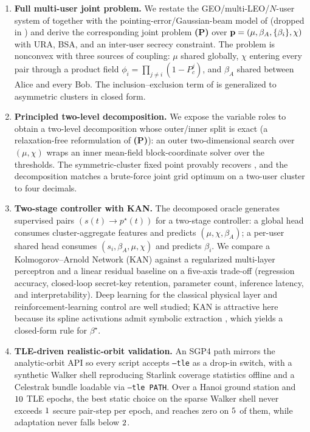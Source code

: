 \begin{enumerate}
\item \textbf{Full multi-user joint problem.} We restate the GEO/multi-LEO/$N$-user system of \cite{vu2023photonics} together with the pointing-error/Gaussian-beam model of \cite{vu2020access} (dropped in \cite{vu2023photonics}) and derive the corresponding joint problem \textbf{(P)} over $\mathbf{p}=(\mu, \beta_A, \{\beta_i\}, \chi)$ with URA, BSA, and an inter-user secrecy constraint. The problem is nonconvex with three sources of coupling: $\mu$ shared globally, $\chi$ entering every pair through a product field $\phi_i = \prod_{j\neq i}(1-P_c^j)$, and $\beta_A$ shared between Alice and every Bob. The inclusion--exclusion term of \cite[Eq.~22]{vu2023photonics} is generalized to asymmetric clusters in closed form.
\item \textbf{Principled two-level decomposition.} We expose the variable roles to obtain a two-level decomposition whose outer/inner split is exact (a relaxation-free reformulation of \textbf{(P)}): an outer two-dimensional search over $(\mu,\chi)$ wraps an inner mean-field block-coordinate solver over the thresholds. The symmetric-cluster fixed point provably recovers \cite[Eq.~24]{vu2023photonics}, and the decomposition matches a brute-force joint grid optimum on a two-user cluster to four decimals.
\item \textbf{Two-stage controller with KAN.} The decomposed oracle generates supervised pairs $(s(t)\!\to\!p^\star(t))$ for a two-stage controller: a global head consumes cluster-aggregate features and predicts $(\mu, \chi, \beta_A)$; a per-user shared head consumes $(s_i, \beta_A, \mu, \chi)$ and predicts $\beta_i$. We compare a Kolmogorov--Arnold Network (KAN) \cite{liu2024kan,liu2024kan2} against a regularized multi-layer perceptron and a linear residual baseline on a five-axis trade-off (regression accuracy, closed-loop secret-key retention, parameter count, inference latency, and interpretability). Deep learning for the classical physical layer \cite{oshea2017introduction,wang2017deep,ye2018deep} and reinforcement-learning control \cite{luong2019applications} are well studied; KAN is attractive here because its spline activations admit symbolic extraction \cite{liu2024kan2,cranmer2020discovering}, which yields a closed-form rule for $\beta^\star$.
\item \textbf{TLE-driven realistic-orbit validation.} An SGP4 path mirrors the analytic-orbit API so every script accepts \texttt{--tle} as a drop-in switch, with a synthetic Walker shell reproducing Starlink coverage statistics offline and a Celestrak bundle loadable via \texttt{--tle PATH}. Over a Hanoi ground station and $10$ TLE epochs, the best static choice on the sparse Walker shell never exceeds $1$ secure pair-step per epoch, and reaches zero on $5$ of them, while adaptation never falls below $2$.

\end{enumerate}
